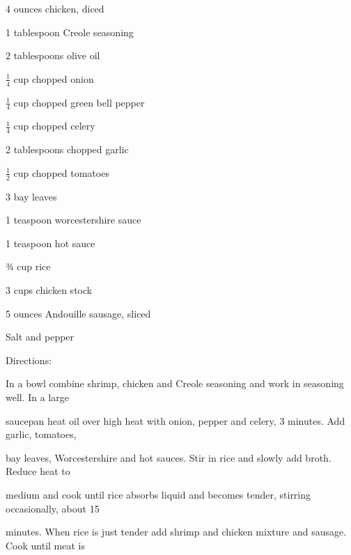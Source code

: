 \documentclass[a4paper,portrait,12pt]{book}
\begin{document}
4 ounces chicken, diced




1 tablespoon Creole seasoning




2 tablespoons olive oil




$\frac{1}{4}$ cup chopped onion




$\frac{1}{4}$ cup chopped green bell pepper




$\frac{1}{4}$ cup chopped celery




2 tablespoons chopped garlic




$\frac{1}{2}$ cup chopped tomatoes




3 bay leaves




1 teaspoon worcestershire sauce




1 teaspoon hot sauce




¾ cup rice




3 cups chicken stock




5 ounces Andouille sausage, sliced




Salt and pepper




Directions:




In a bowl combine shrimp, chicken and Creole seasoning and work in seasoning well. In a large




saucepan heat oil over high heat with onion, pepper and celery, 3 minutes. Add garlic, tomatoes,




bay leaves, Worcestershire and hot sauces. Stir in rice and slowly add broth. Reduce heat to




medium and cook until rice absorbs liquid and becomes tender, stirring occasionally, about 15




minutes. When rice is just tender add shrimp and chicken mixture and sausage. Cook until meat is
\end{document}
